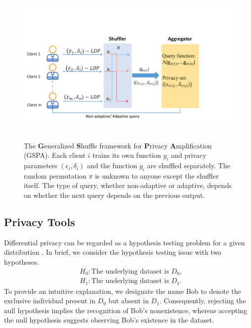 \documentclass[letterpaper]{article} %
\begin{document}
\begin{figure}
  \centering
  \includegraphics[scale = 0.3]{picture/ShufflePlot.pdf}\\
  ~\\
  \caption{The {\bf G}eneralized {\bf S}huffle framework for {\bf P}rivacy {\bf A}mplification (GSPA). Each client $i$ trains its own function $g_i$ and privacy parameters $(\epsilon_i,\delta_i)$ and the function $g_i$ are shuffled separately. 
  The random permutation $\pi$ is unknown to anyone except the shuffler itself. 
  The type of query, whether non-adaptive or adaptive, depends on whether the next query depends on the previous output.
  }\label{Fig:ShufflePlot}
\end{figure}

\subsection{Privacy Tools}
Differential privacy can be regarded as a hypothesis testing problem for a given distribution \cite{Kairouz2015composition}.
 In brief, we consider the hypothesis testing issue with two hypotheses.
\begin{align*}
&H_0: \text{The underlying dataset is } D_0, \\
&H_1: \text{The underlying dataset is } D_1.
\end{align*}     
To provide an intuitive explanation, we designate the name Bob to denote the exclusive individual present in $D_0$ but absent in $D_1$.
Consequently, rejecting the null hypothesis implies the recognition of Bob's nonexistence, whereas accepting the null hypothesis suggests observing Bob's existence in the dataset.
\end{document}
